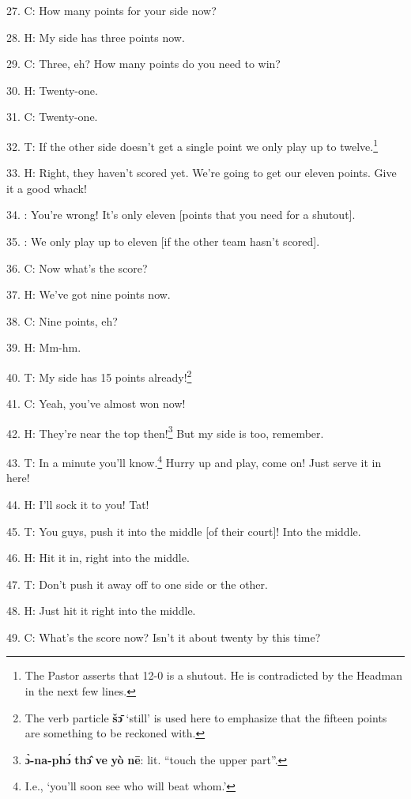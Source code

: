 27. C: How many points for your side now?

28. H: My side has three points now.

29. C: Three, eh? How many points do you need to win?

30. H: Twenty-one.

31. C: Twenty-one.

32. T: If the other side doesn't get a single point we only play up to twelve.\footnote{The Pastor asserts that 12-0 is a shutout. He is contradicted by the Headman in the next few lines.}

33. H: Right, they haven't scored yet. We're going to get our eleven points. Give
it a good whack!

34. : You're wrong! It's only eleven [points that you need for a shutout].

35. : We only play up to eleven [if the other team hasn't scored].

36. C: Now what's the score?

37. H: We've got nine points now.

38. C: Nine points, eh?

39. H: Mm-hm.


40. T: My side has 15 points already!\footnote{The verb particle \textbf{šɔ̄} `still' is used here to emphasize that the fifteen points are something to be reckoned with.}

41. C: Yeah, you've almost won now!

42. H: They're near the top then!\footnote{\textbf{ɔ̀-na-phɔ́} \textbf{thɔ̂} \textbf{ve} \textbf{yò} \textbf{nē}: lit. ``touch the upper part''.} But my side is too, remember.

43. T: In a minute you'll know.\footnote{I.e., `you'll soon see who will beat whom.'} Hurry up and play, come on! Just serve it in
here!

44. H: I'll sock it to you! Tat!


45. T: You guys, push it into the middle [of their court]! Into the middle.

46. H: Hit it in, right into the middle.

47. T: Don't push it away off to one side or the other.

48. H: Just hit it right into the middle.

49. C: What's the score now? Isn't it about twenty by this time?

